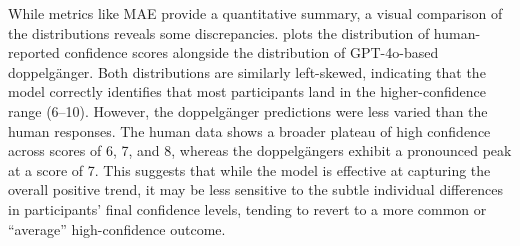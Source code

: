 While metrics like MAE provide a quantitative summary, a visual comparison of the distributions reveals some discrepancies.  plots the distribution of human-reported confidence scores alongside the distribution of GPT-4o-based doppelgänger. Both distributions are similarly left-skewed, indicating that the model correctly identifies that most participants land in the higher-confidence range (6--10). However, the doppelgänger predictions were less varied than the human responses. The human data shows a broader plateau of high confidence across scores of 6, 7, and 8, whereas the doppelgängers exhibit a pronounced peak at a score of 7. This suggests that while the model is effective at capturing the overall positive trend, it may be less sensitive to the subtle individual differences in participants' final confidence levels, tending to revert to a more common or ``average'' high-confidence outcome.




